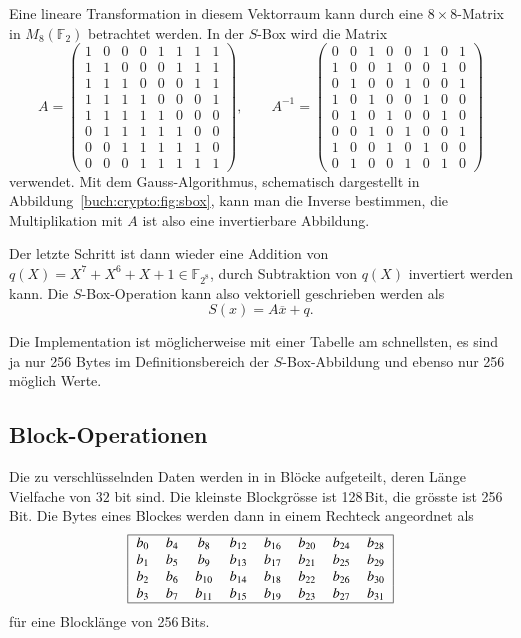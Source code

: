 Eine lineare Transformation in diesem Vektorraum kann durch eine
$8\times 8$-Matrix in $M_8(\mathbb{F}_2)$ betrachtet werden.
In der $S$-Box wird die Matrix
\[
A=
\begin{pmatrix}
1&0&0&0&1&1&1&1\\
1&1&0&0&0&1&1&1\\
1&1&1&0&0&0&1&1\\
1&1&1&1&0&0&0&1\\
1&1&1&1&1&0&0&0\\
0&1&1&1&1&1&0&0\\
0&0&1&1&1&1&1&0\\
0&0&0&1&1&1&1&1
\end{pmatrix},
\qquad
A^{-1}
=
\begin{pmatrix}
0&0&1&0&0&1&0&1\\
1&0&0&1&0&0&1&0\\
0&1&0&0&1&0&0&1\\
1&0&1&0&0&1&0&0\\
0&1&0&1&0&0&1&0\\
0&0&1&0&1&0&0&1\\
1&0&0&1&0&1&0&0\\
0&1&0&0&1&0&1&0
\end{pmatrix}
\]
verwendet.
Mit dem Gauss-Algorithmus, schematisch dargestellt in
Abbildung~\ref{buch:crypto:fig:sbox}, kann man die Inverse
bestimmen, die Multiplikation mit $A$ ist also eine invertierbare
Abbildung.

Der letzte Schritt ist dann wieder eine Addition von
$q(X)=X^7+X^6+X+1\in \mathbb{F}_{2^8}$, durch Subtraktion
von $q(X)$ invertiert werden kann.
Die $S$-Box-Operation kann also vektoriell geschrieben werden als
\[
	S(x) = A\overline{x}+q.
\]

Die Implementation ist möglicherweise mit einer Tabelle am schnellsten,
es sind ja nur 256 Bytes im Definitionsbereich der $S$-Box-Abbildung
und ebenso nur 256 möglich Werte.

\subsection{Block-Operationen
\label{buch:subsection:block-operationen}}
Die zu verschlüsselnden Daten werden in in Blöcke aufgeteilt, deren
Länge Vielfache von $32$ bit sind.
Die kleinste Blockgrösse ist 128\,Bit, die grösste ist 256\,Bit.
Die Bytes eines Blockes werden dann in einem Rechteck angeordnet
als
\begin{equation}
\begin{tabular}{|>{$}c<{$}>{$}c<{$}>{$}c<{$}>{$}c<{$}>{$}c<{$}>{$}c<{$}>{$}c<{$}>{$}c<{$}|}
\hline
 b_{0} & b_{4} & b_{8}  & b_{12} & b_{16} & b_{20} & b_{24} & b_{28} \\
 b_{1} & b_{5} & b_{9}  & b_{13} & b_{17} & b_{21} & b_{25} & b_{29} \\
 b_{2} & b_{6} & b_{10} & b_{14} & b_{18} & b_{22} & b_{26} & b_{30} \\
 b_{3} & b_{7} & b_{11} & b_{15} & b_{19} & b_{23} & b_{27} & b_{31} \\
\hline
\end{tabular}
\label{buch:crypto:eqn:block}
\end{equation}
für eine Blocklänge von 256\,Bits.



